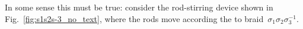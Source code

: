 \documentclass[12pt]{article}
\begin{document}
In some sense this must be true: consider the rod-stirring device shown in
Fig.~\ref{fig:s1s2s-3_no_text}, where the rods move according the to
braid~$\sigma_1\sigma_2\sigma_3^{-1}$.
%
\begin{figure}
\begin{center}
\hspace{2em}
\end{center}
\end{figure}
\end{document}

